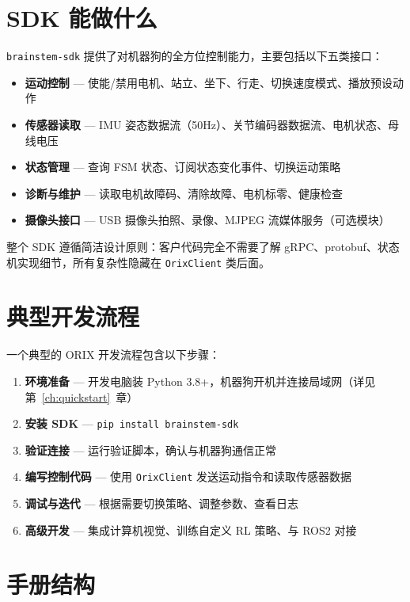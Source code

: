 \documentclass[a4paper,11pt,openany]{book}
\begin{document}
\section{SDK 能做什么}

\texttt{brainstem-sdk} 提供了对机器狗的全方位控制能力，主要包括以下五类接口：

\begin{itemize}
  \item \textbf{运动控制} --- 使能/禁用电机、站立、坐下、行走、切换速度模式、播放预设动作
  \item \textbf{传感器读取} --- IMU 姿态数据流（50Hz）、关节编码器数据流、电机状态、母线电压
  \item \textbf{状态管理} --- 查询 FSM 状态、订阅状态变化事件、切换运动策略
  \item \textbf{诊断与维护} --- 读取电机故障码、清除故障、电机标零、健康检查
  \item \textbf{摄像头接口} --- USB 摄像头拍照、录像、MJPEG 流媒体服务（可选模块）
\end{itemize}

整个 SDK 遵循简洁设计原则：客户代码完全不需要了解 gRPC、protobuf、状态机实现细节，所有复杂性隐藏在 \texttt{OrixClient} 类后面。

\section{典型开发流程}

一个典型的 ORIX 开发流程包含以下步骤：

\begin{enumerate}
  \item \textbf{环境准备} --- 开发电脑装 Python 3.8+，机器狗开机并连接局域网（详见第~\ref{ch:quickstart}~章）
  \item \textbf{安装 SDK} --- \texttt{pip install brainstem-sdk}
  \item \textbf{验证连接} --- 运行验证脚本，确认与机器狗通信正常
  \item \textbf{编写控制代码} --- 使用 \texttt{OrixClient} 发送运动指令和读取传感器数据
  \item \textbf{调试与迭代} --- 根据需要切换策略、调整参数、查看日志
  \item \textbf{高级开发} --- 集成计算机视觉、训练自定义 RL 策略、与 ROS2 对接
\end{enumerate}

\section{手册结构}
\end{document}
